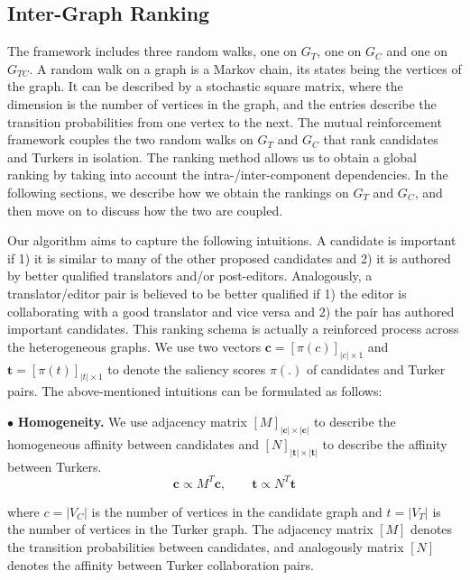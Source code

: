 \documentclass[11pt]{article}
\begin{document}
\subsection{Inter-Graph Ranking}

The framework includes three random walks, one on $G_T$, one on $G_C$ and one on $G_{TC}$. A random walk on a graph is a Markov chain, its states being the vertices of the graph. It can be described by a stochastic square matrix, where the dimension is the number of vertices in the graph, and the entries describe the transition probabilities from one vertex to the next. The mutual reinforcement framework couples the two random walks on $G_T$ and $G_C$ that rank candidates and Turkers in isolation. The ranking method allows us to obtain a global ranking by taking into account the intra-/inter-component dependencies. In the following sections, we describe how we obtain the rankings on $G_T$ and $G_C$, and then move on to discuss how the two are coupled.

Our algorithm aims to capture the following intuitions. A candidate is important if 1) it is similar to many of the other proposed candidates and 2) it is authored by better qualified translators and/or post-editors. Analogously, a translator/editor pair is believed to be better qualified if 1) the editor is collaborating with a good translator and vice versa and 2) the pair has authored important candidates. This ranking schema is actually a reinforced process across the heterogeneous graphs. We use two vectors $\textbf{c}=[\pi(c)]_{|c| \times 1}$ and $\textbf{t}=[\pi(t)]_{|t| \times 1}$ to denote the saliency scores $\pi(.)$ of candidates and Turker pairs. The above-mentioned intuitions can be formulated as follows:

$\bullet$ \textbf{Homogeneity.} We use adjacency matrix $[M]_{|\textbf{c}|\times |\textbf{c}|}$ to describe the homogeneous affinity between candidates and $[N]_{|\textbf{t}| \times |\textbf{t}|}$ to describe the affinity between Turkers.
\begin{equation}
\textbf{c} \propto {M}^{T} \textbf{c}, \qquad \textbf{t} \propto {N}^{T} \textbf{t}
\end{equation}

where $c=|V_C|$ is the number of vertices in the candidate graph and $t=|V_T|$ is the number of vertices in the Turker graph. The adjacency matrix $[M]$ denotes the transition probabilities between candidates, and analogously matrix $[N]$ denotes the affinity between Turker collaboration pairs.
\end{document}
